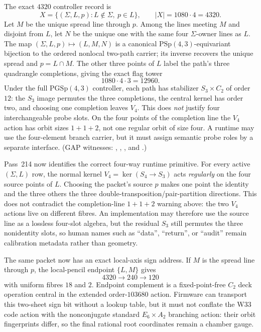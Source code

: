 \documentclass[11pt]{article}
\begin{document}
The exact $4320$ controller record is
\[
 X=\{(\Sigma,L,p):L\notin\Sigma,\ p\in L\},\qquad |X|=1080\cdot4=4320.
\]
Let $M$ be the unique spread line through $p$.  Among the lines meeting $M$ and disjoint from $L$, let
$N$ be the unique one with the same four $\Sigma$-owner lines as $L$.  The map
$(\Sigma,L,p)\mapsto(L,M,N)$ is a canonical $\mathrm{PSp}(4,3)$-equivariant bijection to the ordered
nonlocal two-path carrier; its inverse recovers the unique spread and $p=L\cap M$.  The other three
points of $L$ label the path's three quadrangle completions, giving the exact flag tower
\[
 1080\cdot4\cdot3=12960.
\]
Under the full $\mathrm{PGSp}(4,3)$ controller, each path has stabilizer $S_3\times C_2$ of order $12$:
the $S_3$ image permutes the three completions, the central kernel has order two, and choosing one
completion leaves $V_4$.  This does \emph{not} justify four interchangeable probe slots.  On the four
points of the completion line the $V_4$ action has orbit sizes $1+1+2$, not one regular orbit of size
four.  A runtime may use the four-element branch carrier, but it must assign semantic probe roles by a
separate interface.  (GAP witnesses:
,
,
, and
.)

Pass~214 now identifies the correct four-way runtime primitive.  For every
active $(\Sigma,L)$ row, the normal kernel
$V_4=\ker(S_4\to S_3)$ acts \emph{regularly} on the four source points of
$L$.  Choosing the packet's source $p$ makes one point the identity and the
three others the three double-transposition/pair-partition directions.  This
does not contradict the completion-line $1+1+2$ warning above: the two
$V_4$ actions live on different fibres.  An implementation may therefore
use the source line as a lossless four-slot algebra, but the residual $S_3$
still permutes the three nonidentity slots, so human names such as
``data'', ``return'', or ``audit'' remain calibration metadata rather than
geometry.

The same packet now has an exact local-axis sign address.  If $M$ is the
spread line through $p$, the local-pencil endpoint $\{L,M\}$ gives
\[
 4320\longrightarrow240\longrightarrow120
\]
with uniform fibres $18$ and $2$.  Endpoint complement is a fixed-point-free
$C_2$ deck operation central in the extended order-$103680$ action.  Firmware
can transport this two-sheet sign bit without a lookup table, but it must not conflate the W33
code action with the nonconjugate standard $E_6\times A_2$ branching action:
their orbit fingerprints differ, so the final rational root coordinates
remain a chamber gauge.
\end{document}
